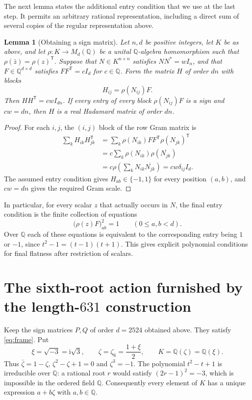 \documentclass[10pt]{article}
\newtheorem{lemma}[theorem]{Lemma}
\newcommand{\Q}{\mathbb Q}
\begin{document}
The next lemma states the additional entry condition that we use at the
last step. It permits an arbitrary rational representation, including a
direct sum of several copies of the regular representation above.

\begin{lemma}[Obtaining a sign matrix]
\label{lem:sign-restriction}
Let $n,d$ be positive integers, let $K$ be as above, and let
$\rho:K\longrightarrow M_d(\Q)$ be a
unital $\Q$-algebra homomorphism such that
$\rho(\bar z)=\rho(z)^{\mathsf T}$. Suppose that $N\in K^{n\times n}$
satisfies $NN^*=wI_n$, and that $F\in\Q^{d\times d}$ satisfies
$FF^{\mathsf T}=cI_d$ for $c\in\Q$. Form the matrix $H$ of order $dn$ with blocks
\[
 H_{ij}=\rho(N_{ij})F.
\]
Then $HH^{\mathsf T}=cwI_{dn}$. If every entry of every block
$\rho(N_{ij})F$ is a sign and $cw=dn$, then $H$ is a real Hadamard
matrix of order $dn$.
\end{lemma}

\begin{proof}
For each $i,j$, the $(i,j)$ block of the row Gram matrix is
\begin{align*}
 \sum_k H_{ik}H_{jk}^{\mathsf T}
 &=\sum_k\rho(N_{ik})FF^{\mathsf T}\rho(N_{jk})^{\mathsf T}\\
 &=c\sum_k\rho(N_{ik})\rho(\overline{N_{jk}})\\
 &=c\rho\!\left(\sum_kN_{ik}\overline{N_{jk}}\right)
 =cw\delta_{ij}I_d.
\end{align*}
The assumed entry condition gives $H_{ab}\in\{-1,1\}$ for every
position $(a,b)$, and $cw=dn$ gives the required Gram scale.
\end{proof}

In particular, for every scalar $z$ that actually occurs in $N$, the
final entry condition is the finite collection of equations
\[
 \bigl(\rho(z)F\bigr)_{ab}^{2}=1
       \qquad(0\leq a,b<d).
\]
Over $\Q$ each of these equations is equivalent to the corresponding
entry being $1$ or $-1$, since $t^2-1=(t-1)(t+1)$. This gives explicit
polynomial conditions for final flatness after restriction of scalars.

\section{The sixth-root action furnished by the \texorpdfstring{length-$631$}{length-631} construction}
\label{sec:sixth-root-action}

Keep the sign matrices $P,Q$ of order $d=2524$ obtained above. They
satisfy \eqref{eq:frame}. Put
\[
 \xi=\sqrt{-3}=\mathrm i\sqrt3,\qquad
 \zeta=\zeta_6=\frac{1+\xi}{2},\qquad
 K=\Q(\zeta)=\Q(\xi).
\]
Thus $\bar\zeta=1-\zeta$, $\zeta^2-\zeta+1=0$ and $\zeta^3=-1$.
The polynomial $t^2-t+1$ is irreducible over $\Q$: a rational root
$r$ would satisfy $(2r-1)^2=-3$, which is impossible in the ordered
field $\Q$. Consequently every element of $K$ has a unique expression
$a+b\zeta$ with $a,b\in\Q$.
\end{document}
